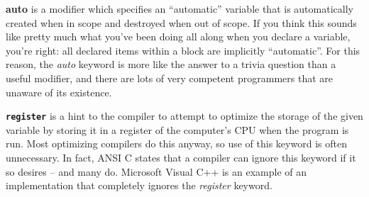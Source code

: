 \textbf{auto} is a modifier which specifies an ``automatic'' variable that is
automatically created when in scope and destroyed when out of scope. If you
think this sounds like pretty much what you've been doing all along when you
declare a variable, you're right: all declared items within a block are
implicitly ``automatic''. For this reason, the \emph{auto} keyword is more like
the answer to a trivia question than a useful modifier, and there are lots of
very competent programmers that are unaware of its existence.

\textbf{\texttt{register}} is a hint to the compiler to attempt to optimize the
storage of the given variable by storing it in a register of the computer's CPU
when the program is run. Most optimizing compilers do this anyway, so use of
this keyword is often unnecessary. In fact, ANSI C states that a compiler can
ignore this keyword if it so desires -- and many do. Microsoft Visual C++ is an
example of an implementation that completely ignores the \emph{register}
keyword.
